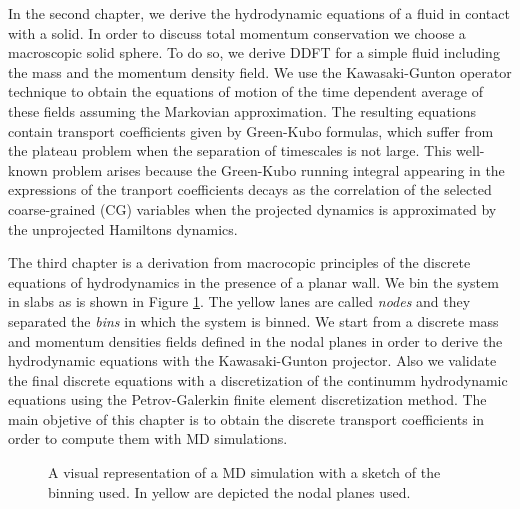 \documentclass[b5paper,openright,10pt]{book}
\begin{document}
In the second chapter, we derive the hydrodynamic equations of a fluid in contact with a solid. In order to discuss total momentum conservation we choose a macroscopic solid sphere. 
To do so, we derive DDFT for a simple fluid including the mass and the momentum density field.
We use the Kawasaki-Gunton operator technique to obtain the equations of motion of the time dependent average of these fields assuming the Markovian approximation. 
The resulting equations contain transport coefficients given by  Green-Kubo formulas, which suffer from the plateau problem when the separation of timescales is not large.  
This well-known problem arises because the Green-Kubo running integral appearing in the expressions of the tranport coefficients decays as the correlation of the selected coarse-grained (CG) variables when the projected dynamics is approximated by the unprojected Hamiltons dynamics. 

The third chapter is a derivation from macrocopic principles of the discrete equations of hydrodynamics in the presence of a planar wall. 
We bin the system in slabs as is shown in Figure \ref{fig:WallsBox1}. The yellow lanes are called {\it nodes} and they separated the {\it bins} in which the system is binned. We start from a discrete mass and momentum densities fields defined in the nodal planes in order to derive the hydrodynamic equations with the Kawasaki-Gunton projector. Also we validate the final discrete equations  with a discretization of the continumm hydrodynamic equations using the Petrov-Galerkin finite element discretization method.   
The main objetive of this chapter is to obtain the discrete transport coefficients in order to compute them with MD simulations. 
\begin{figure}
    \centering
    \caption[Visual representation of a MD simulation with a sketch of the binning used]{A visual representation of a MD simulation with a sketch of the binning used. In yellow are depicted the nodal planes used.}
    \label{fig:WallsBox1}
\end{figure}
\end{document}
